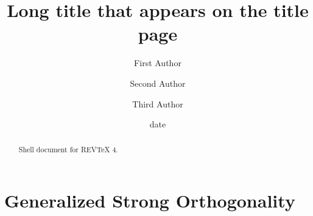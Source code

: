\documentclass[aps,preprint]{revtex4}%
\begin{document}
\title[Short title for running header]{Long title that appears on the title page}
\author{First Author}
\author{Second Author}
\author{Third Author}

\begin{abstract}
Shell document for REV\TeX{} 4.

\end{abstract}
\date[Date text]{date}




\maketitle
\tableofcontents


\section{Generalized Strong Orthogonality}
\end{document}
